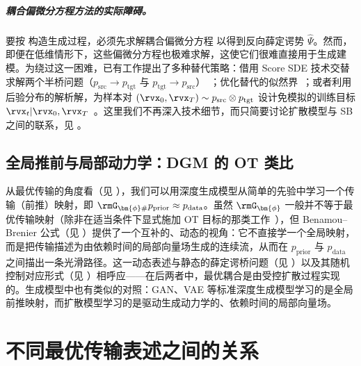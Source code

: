 \subparagraph{耦合偏微分方程方法的实际障碍。}
要按  构造生成过程，必须先求解耦合偏微分方程  以得到反向薛定谔势 $\widehat{\Psi}$。然而，即便在低维情形下，这些偏微分方程也极难求解，这使它们很难直接用于生成建模。为绕过这一困难，已有工作提出了多种替代策略：借用 Score SDE 技术交替求解两个半桥问题（$p_{\mathrm{src}} \to p_{\mathrm{tgt}}$ 与 $p_{\mathrm{tgt}} \to p_{\mathrm{src}}$）~\citep{de2021diffusion}；优化替代的似然界~\citep{chenlikelihood, liu20232}；或者利用后验分布的解析解，为样本对 $(\rvx_0, \rvx_T) \sim p_{\mathrm{src}} \otimes p_{\mathrm{tgt}}$ 设计免模拟的训练目标 $\rvx_t \vert \rvx_0, \rvx_T$~\citep{liu20232}。这里我们不再深入技术细节，而只简要讨论扩散模型与 SB 之间的联系，见 。

\subsection{全局推前与局部动力学：DGM 的 OT 类比}
从最优传输的角度看（见 ），我们可以用深度生成模型从简单的先验中学习一个传输（前推）映射，即
$\rmG_{\bm{\phi}\#}p_{\mathrm{prior}} \approx p_{\mathrm{data}}$。虽然 $\rmG_{\bm{\phi}}$ 一般并不等于最优传输映射（除非在适当条件下显式施加 OT 目标的那类工作~\citep{genevay2018learning,onken2021ot}），但 Benamou--Brenier 公式（见 ）提供了一个互补的、动态的视角：它不直接学一个全局映射，而是把传输描述为由依赖时间的局部向量场生成的连续流，从而在 $p_{\mathrm{prior}}$ 与 $p_{\mathrm{data}}$ 之间描出一条光滑路径。这一动态表述与静态的薛定谔桥问题（见 ）以及其随机控制对应形式（见 ）相呼应——在后两者中，最优耦合是由受控扩散过程实现的。生成模型中也有类似的对照：GAN、VAE 等标准深度生成模型学习的是全局前推映射，而扩散模型学习的是驱动生成动力学的、依赖时间的局部向量场。


\section{不同最优传输表述之间的关系}\label{sec:relation-ot}

